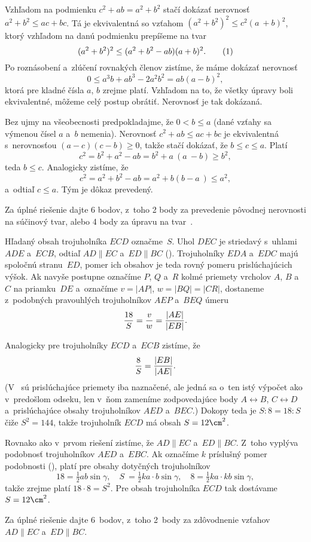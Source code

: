 {%
Vzhľadom na podmienku $c^2 + ab = a^2 + b^2$
stačí dokázať nerovnosť $a^2 + b^2 \le ac + bc$.
Tá je ekvivalentná so vzťahom $(a^2 + b^2 )^2 \le c^2 (a~+ b)^2$,
ktorý vzhľadom na danú podmienku prepíšeme na tvar
$$
(a^2 + b^2 )^2 \le (a^2 + b^2 - ab)(a + b)^2 . \tag1
$$
Po roznásobení a~zlúčení rovnakých členov zistíme, že máme dokázať
nerovnosť
$$
0 \le a^3b + ab^3 - 2a^2b^2 = ab(a - b)^2,
$$
ktorá pre kladné čísla $a$, $b$ zrejme platí. Vzhľadom na to, že všetky úpravy boli
ekvivalentné, môžeme celý postup obrátiť. Nerovnosť je tak dokázaná.

\ineriesenie
Bez ujmy na všeobecnosti predpokladajme, že $0 < b \le a$ (dané vzťahy sa výmenou
čísel $a$ a~$b$ nemenia). Nerovnosť $c^2 + ab\le ac + bc$ je ekvivalentná
s~nerovnosťou $(a- c)(c-b) \ge 0$, takže
stačí dokázať, že $b \le c \le a$. Platí
$$
c^2 = b^2 + a^2 - ab = b^2 + a~(a~- b) \ge b^2 ,
$$
teda $b \le c$. Analogicky zistíme, že
$$
c^2 = a^2 + b^2 - ab = a^2 + b(b - a~) \le a^2,
$$
a~odtiaľ $c \le a$. Tým je dôkaz prevedený.

\nobreak\medskip\petit\noindent
Za úplné riešenie dajte 6 bodov, z~toho 2 body za prevedenie pôvodnej
nerovnosti na súčinový tvar, alebo 4 body za úpravu na tvar~.

\endpetit
\bigbreak
}

{%
Hľadaný obsah trojuholníka $ECD$ označme~$S$. Uhol $DEC$ je striedavý
s~uhlami $ADE$ a~$ECB$, odtiaľ $AD \parallel EC$ a~$ED \parallel BC$ (\obr).
%
Trojuholníky $EDA$ a~$EDC$ majú spoločnú stranu~$ED$, pomer ich obsahov je teda rovný
pomeru prislúchajúcich výšok. Ak navyše postupne označíme $P$, $Q$ a~$R$ kolmé priemety
vrcholov $A$, $B$ a~$C$ na priamku~$DE$ a~označíme $v=|AP|$, $w=|BQ|=|CR|$,
dostaneme z~podobných pravouhlých trojuholníkov $AEP$ a~$BEQ$ úmeru
$$
{18\over S} = {v\over w} = {|AE| \over |EB|}.
$$

Analogicky pre trojuholníky $ECD$ a~$ECB$ zistíme, že
$$
{8\over S} = {|EB| \over |AE|}.
$$
(V~ sú prislúchajúce priemety iba naznačené, ale jedná sa o~ten istý výpočet ako
v~predošlom odseku, len v~ňom zameníme zodpovedajúce body $A \leftrightarrow B$,
$C \leftrightarrow D$ a~prislúchajúce obsahy trojuholníkov $AED$ a~$BEC$.)
Dokopy teda je $S:8=18:S$ čiže $S^2=144$, takže trojuholník $ECD$ má obsah $S=12\cm^2$.


\ineriesenie
Rovnako ako v~prvom riešení zistíme, že $AD \parallel EC$ a~$ED \parallel BC$.
Z~toho vyplýva podobnosť trojuholníkov $AED$ a~$EBC$. Ak označíme $k$ príslušný pomer
podobnosti (\obr), platí pre obsahy dotyčných trojuholníkov
$$
18 = \tfrac12 ab \sin\gamma ,\quad
S~= \tfrac12 ka \cdot b \sin\gamma , \quad
8 = \tfrac12 ka \cdot kb \sin\gamma ,
$$
takže zrejme platí $18 \cdot 8 = S^2$. Pre obsah
trojuholníka $ECD$ tak dostávame $S=12\cm^2$.
%


\nobreak\medskip\petit\noindent
Za úplné riešenie dajte 6~bodov, z~toho 2~body za zdôvodnenie vzťahov $AD \parallel EC$
a~$ED \parallel BC$.

\endpetit
\bigbreak
}

